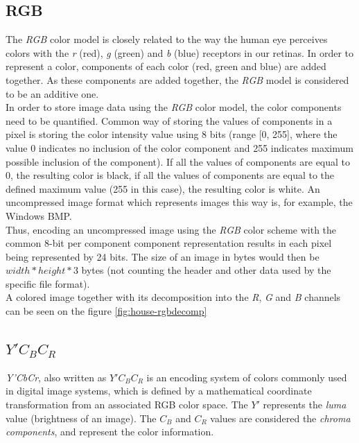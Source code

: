\documentclass[thesis=M,english]{FITthesis}[2012/10/20]
\begin{document}
\subsection{RGB}
The \emph{RGB} color model is closely related to the way the human eye perceives colors
with the \emph{r} (red), \emph{g} (green) and \emph{b} (blue) receptors in our retinas.\cite{img:color-theory}
In order to represent a color, components of each color (red, green and blue) are added together.
As these components are added together, the \emph{RGB} model is considered to be an additive one.
\\

In order to store image data using the \emph{RGB} color model, the color components
need to be quantified. Common way of storing the values of components in a pixel
is storing the color intensity value using 8 bits (range [0, 255], where the
value 0 indicates no inclusion of the color component and 255 indicates maximum
possible inclusion of the component). If all the values of components are
equal to 0, the resulting color is black, if all the values of components are
equal to the defined maximum value (255 in this case), the resulting color
is white. An uncompressed image format which represents images this way is, for
example, the Windows BMP.\cite{fileformat-bmp}
\\

Thus, encoding an uncompressed image using the \emph{RGB} color scheme with
the common 8-bit per component component representation results in each pixel
being represented by 24 bits. The size of an image in bytes would then be
$width*height*3$ bytes (not counting the header and other data used by the
specific file format).
\\

A colored image together with its decomposition into the \emph{R}, \emph{G}
and \emph{B} channels can be seen on the figure \ref{fig:house-rgbdecomp}


\subsection{$Y'C_{B}C_{R}$}
\emph{Y'CbCr}, also written as $Y'C_{B}C_{R}$ is an encoding system of colors commonly
used in digital image systems, which is defined by a mathematical coordinate
transformation from an associated RGB color space. The $Y'$ represents the
\emph{luma} value (brightness of an image). The $C_{B}$ and $C_{R}$ values
are considered the \emph{chroma components}, and represent the color information.
\end{document}
